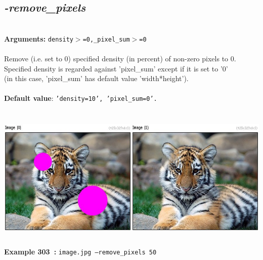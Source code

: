 \documentclass[a4paper,11pt,twoside]{book}
\begin{document}
\subsection{\emph{-remove\_pixels} }\vspace*{-0.5em}
~\\\textbf{Arguments: } 
{\small \texttt{density$>$=0,\_pixel\_sum$>$=0}}\\~\\
Remove (i.e. set to 0) specified density (in percent) of non-zero pixels to 0.
~\\Specified density is regarded against 'pixel\_sum' except if it is set to '0'
~\\(in this case, 'pixel\_sum' has default value 'width*height').
~\\~\\\textbf{Default value}: {\small \texttt{'density=10', 'pixel\_sum=0'.}}
\begin{center}\includegraphics[keepaspectratio=true,height=7cm,width=\textwidth]{img/gmic_def303.jpg}\\
{\footnotesize \textbf{Example 303~:} \texttt{image.jpg --remove\_pixels 50}}
\end{center}
\end{document}
